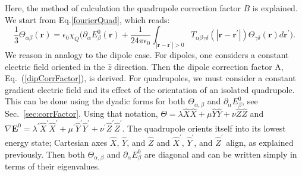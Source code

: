Here, the method of calculation the quadrupole correction factor $B$ is explained.  We start from Eq.\ref{fourierQuad}, which reads:
\begin{equation}
\frac{1}{3} \Theta_{\alpha \beta}(\mathbf{r}) = \epsilon_0 \chi_Q
\Big (\partial_\alpha E_\beta^0(\mathbf{r}) + \frac{1}{24 \pi \epsilon_0}
\int_{|\mathbf{r}-\mathbf{r}^\prime| > 0}
T_{\alpha \beta \gamma \delta} (|\mathbf{r}-\mathbf{r}^\prime|) 
\Theta_{\gamma \delta} (\mathbf{r}) d\mathbf{r}^\prime \Big ).
\label{eq:p34}
\end{equation}
We reason in analogy to the dipole case.  For dipoles, one
considers a constant electric field oriented in the $\hat{z}$ direction.  
Then the dipole correction factor A, Eq.~(\ref{dipCorrFactor}), is derived.
For quadrupoles, we must consider a constant gradient electric field and
its effect of the orientation of an isolated quadrupole.  This can be done
using the dyadic forms for both $\Theta_{\alpha,\beta}$ and $\partial_\alpha E_\beta^0$, see Sec.~\ref{sec:corrFactor}. Using that  notation, 
$\Theta=\lambda \hat{X}  \hat{X} + \mu \hat{Y} \hat{Y} + \nu \hat{Z}  \hat{Z}$
and $\nabla \mathbf{E}^0=
\lambda^\prime \hat{X}^\prime  \hat{X}^\prime
+ \mu^\prime \hat{Y}^\prime \hat{Y}^\prime + \nu^\prime \hat{Z}^\prime  \hat{Z}^\prime$. The quadrupole orients itself into its lowest energy state; Cartesian axes 
$\hat{X}$, $\hat{Y}$, and $\hat{Z}$ and $\hat{X}^\prime$, $\hat{Y}^\prime$, and $\hat{Z}^\prime$ align,
as explained previously. Then both $\Theta_{\alpha,\beta}$ and $\partial_\alpha E_\beta^0$ are diagonal
and can be written simply in terms of their eigenvalues.

